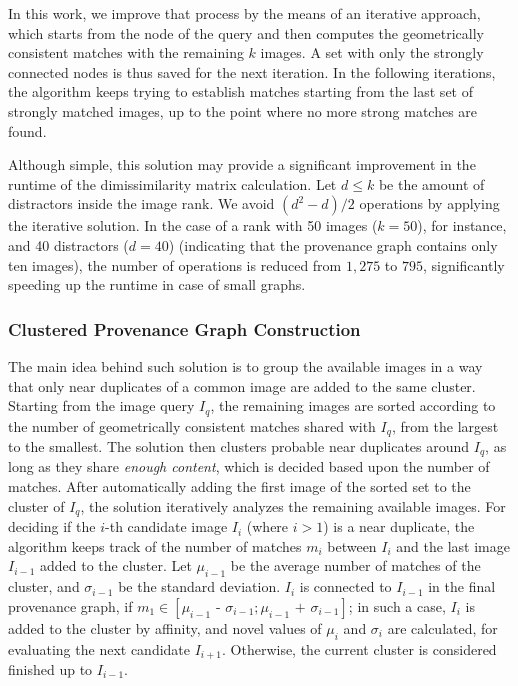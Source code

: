 In this work, we improve that process by the means of an iterative approach, which starts from the node of the query and then computes the geometrically consistent matches with the remaining $k$ images.
A set with only the strongly connected nodes is thus saved for the next iteration.
In the following iterations, the algorithm keeps trying to establish matches starting from the last set of strongly matched images, up to the point where no more strong matches are found.

Although simple, this solution may provide a significant improvement in the runtime of the dimissimilarity matrix calculation.
Let $d\leq k$ be the amount of distractors inside the image rank.
We avoid $(d^2 - d) / 2$ operations by applying the iterative solution.
In the case of a rank with 50 images ($k=50$), for instance, and 40 distractors ($d=40$) (indicating that the provenance graph contains only ten images), the number of operations is reduced from $1,275$ to $795$, significantly speeding up the runtime in case of small graphs.

\vspace{0.2cm}
\subsubsection{Clustered Provenance Graph Construction}
\label{sec:prop_cluster}

The main idea behind such solution is to group the available images in a way that only near duplicates of a common image are added to the same cluster.
Starting from the image query $I_q$, the remaining images are sorted according to the number of geometrically consistent matches shared with $I_q$, from the largest to the smallest.
The solution then clusters probable near duplicates around $I_q$, as long as they share \emph{enough content}, which is decided based upon the number of matches.
After automatically adding the first image of the sorted set to the cluster of $I_q$, the solution iteratively analyzes the remaining available images.
For deciding if the $i$-th candidate image $I_i$ (where $i>1$) is a near duplicate, the algorithm keeps track of the number of matches $m_i$ between $I_i$ and the last image $I_{i-1}$ added to the cluster.
Let $\mu_{i-1}$ be the average number of matches of the cluster, and $\sigma_{i-1}$ be the standard deviation.
$I_i$ is connected to $I_{i-1}$ in the final provenance graph, if $m_1 \in [\mu_{i-1} \text{ - } \sigma_{i-1}; \mu_{i-1} \text{ + } \sigma_{i-1}]$; in such a case, $I_i$ is added to the cluster by affinity, and novel values of $\mu_i$ and $\sigma_i$ are calculated, for evaluating the next candidate $I_{i+1}$.
Otherwise, the current cluster is considered finished up to $I_{i-1}$.

